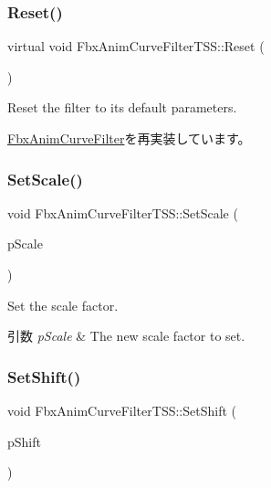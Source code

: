\subsubsection{\texorpdfstring{Reset()}{Reset()}}
{\footnotesize\ttfamily virtual void Fbx\+Anim\+Curve\+Filter\+T\+S\+S\+::\+Reset (\begin{DoxyParamCaption}{ }\end{DoxyParamCaption})\hspace{0.3cm}{\ttfamily [virtual]}}

Reset the filter to its default parameters. 

\hyperlink{class_fbx_anim_curve_filter_a57fb35baaaa85adb08946383cf40e811}{Fbx\+Anim\+Curve\+Filter}を再実装しています。

\mbox{\label{class_fbx_anim_curve_filter_t_s_s_a0f3661baf7b2511fb6d9a292d19a31dc}} 
\subsubsection{\texorpdfstring{Set\+Scale()}{SetScale()}}
{\footnotesize\ttfamily void Fbx\+Anim\+Curve\+Filter\+T\+S\+S\+::\+Set\+Scale (\begin{DoxyParamCaption}\item[{double}]{p\+Scale }\end{DoxyParamCaption})}

Set the scale factor. 
\begin{DoxyParams}{引数}
{\em p\+Scale} & The new scale factor to set. \\
\hline
\end{DoxyParams}
\mbox{\label{class_fbx_anim_curve_filter_t_s_s_a7f8c6250190a961284e894e977b4233f}} 
\subsubsection{\texorpdfstring{Set\+Shift()}{SetShift()}}
{\footnotesize\ttfamily void Fbx\+Anim\+Curve\+Filter\+T\+S\+S\+::\+Set\+Shift (\begin{DoxyParamCaption}\item[{\hyperlink{class_fbx_time}{Fbx\+Time} \&}]{p\+Shift }\end{DoxyParamCaption})}

